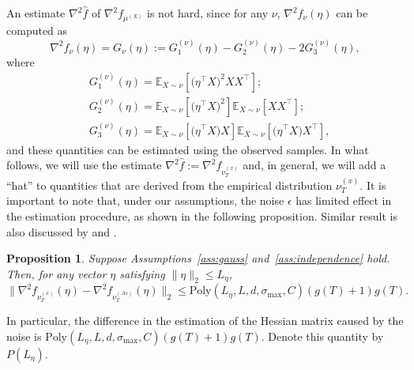 \documentclass[jmlr]{article}
\newcommand{\E}{\mathbb{E}}
\newtheorem{prop}[lemma]{Proposition}
\theoremstyle{definition}
\begin{document}
An estimate $\nabla^2 \hat{f}$ of $\nabla^2f_{\mu^{(X)}}$ is not hard, since for any $\nu$,
$\nabla^2f_{\nu}(\eta)$  can be computed as
\begin{equation}
\label{eq:G}
\nabla^2 f_{\nu}(\eta) = G_{\nu}(\eta):= G_1^{(\nu)}(\eta) - G_2^{(\nu)}(\eta) -2G_3^{(\nu)}(\eta),
\end{equation}
where 
\vspace{-3mm}
\begin{align*}
& G_1^{(\nu)}(\eta) =  \E_{X\sim \nu} [\big(\eta^{\top}X\big)^2XX^{\top}]; \\
& G_2^{(\nu)}(\eta) = \E_{X\sim \nu} [\big(\eta^{\top}X\big)^2] \E_{X\sim \nu} [XX^{\top}]; \\
& G_3^{(\nu)}(\eta) = \E_{X\sim \nu} [\big(\eta^{\top}X\big)X] \E_{X\sim \nu} [\big(\eta^{\top}X\big)X^{\top}],
\end{align*} 
and these quantities can be estimated using the observed samples. In what follows, we will use the estimate $\nabla^2 \hat{f}:=\nabla^2 f_{\nu_T^{(x)}}$ and, in general, we will add a ``hat'' to quantities that are derived from the empirical distribution $\nu_T^{(x)}$. 
It is important to note that, under our assumptions, the noise $\epsilon$ has limited effect in the estimation procedure, as shown in the following proposition. Similar result is also discussed by \citet{arora2012provable} and \citet{belkin2013blind}.
\begin{prop}
 \label{prop:denoise}
 Suppose Assumptions~\ref{ass:gauss} and~\ref{ass:independence} hold. Then,
for any vector $\eta$ satisfying $\|\eta\|_2\le L_{\eta}$,
\[
\| \nabla^2f_{\nu_T^{(x)}}(\eta) - \nabla^2f_{\nu_T^{(As)}}(\eta) \|_2 \le \text{Poly}(L_{\eta}, L, d, \sigma_{\max}, C)(g(T)+1)g(T). 
\] 
\end{prop}

In particular, the difference in the estimation of the Hessian matrix caused by the noise is $\text{Poly}(L_{\eta}, L, d, \sigma_{\max}, C)(g(T)+1)g(T)$. Denote this quantity by $P(L_{\eta})$. 
\end{document}
